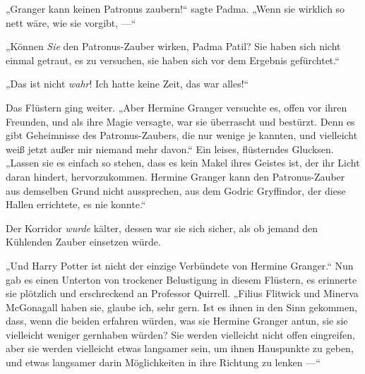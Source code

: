 „Granger kann keinen Patronus zaubern!“ sagte Padma.
„Wenn sie wirklich so nett wäre, wie sie vorgibt, —“

„Können \emph{Sie} den Patronus-Zauber wirken, Padma Patil? Sie haben sich nicht einmal getraut, es zu versuchen, sie haben sich vor dem Ergebnis gefürchtet.“

„Das ist nicht \emph{wahr}! Ich hatte keine Zeit, das war alles!“

Das Flüstern ging weiter.
„Aber Hermine Granger versuchte es, offen vor ihren Freunden, und als ihre Magie versagte, war sie überrascht und bestürzt. Denn es gibt Geheimnisse des Patronus-Zaubers, die nur wenige je kannten, und vielleicht weiß jetzt außer mir niemand mehr davon.“ Ein leises, flüsterndes Glucksen.
„Lassen sie es einfach so stehen, dass es kein Makel ihres Geistes ist, der ihr Licht daran hindert, hervorzukommen. Hermine Granger kann den Patronus-Zauber aus demselben Grund nicht aussprechen, aus dem Godric Gryffindor, der diese Hallen errichtete, es nie konnte.“

Der Korridor \emph{wurde} kälter, dessen war sie sich sicher, als ob jemand den Kühlenden Zauber einsetzen würde.

„Und Harry Potter ist nicht der einzige Verbündete von Hermine Granger.“ Nun gab es einen Unterton von trockener Belustigung in diesem Flüstern, es erinnerte sie plötzlich und erschreckend an Professor Quirrell.
„Filius Flitwick und Minerva McGonagall haben sie, glaube ich, sehr gern. Ist es ihnen in den Sinn gekommen, dass, wenn die beiden erfahren würden, was sie Hermine Granger antun, sie sie vielleicht weniger gernhaben würden? Sie werden vielleicht nicht offen eingreifen, aber sie werden vielleicht etwas langsamer sein, um ihnen Hauspunkte zu geben, und etwas langsamer darin Möglichkeiten in ihre Richtung zu lenken —“


